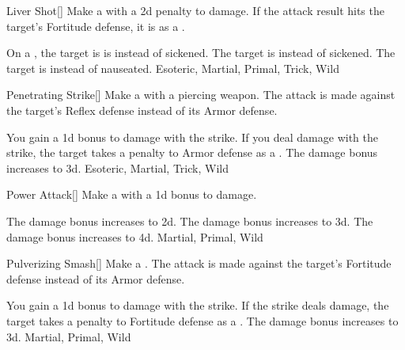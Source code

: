 \lowercase{\hypertarget{maneuver:Liver Shot}{}}\label{maneuver:Liver Shot}
\hypertarget{maneuver:Liver Shot}{}
\begin{freeability}{Liver Shot}[]
Make a  with a \minus2d penalty to damage.
If the attack result hits the target's Fortitude defense,
it is  as a .

\rankline
{} On a , the target is is  instead of sickened.
 The target is  instead of sickened.
 The target is  instead of nauseated.
 Esoteric, Martial, Primal, Trick, Wild
\end{freeability}
\vspace{0.25em}



\lowercase{\hypertarget{maneuver:Penetrating Strike}{}}\label{maneuver:Penetrating Strike}
\hypertarget{maneuver:Penetrating Strike}{}
\begin{freeability}{Penetrating Strike}[]
Make a  with a piercing weapon.
The attack is made against the target's Reflex defense instead of its Armor defense.

\rankline
{} You gain a \plus1d bonus to damage with the strike.
 If you deal damage with the strike, the target takes a  penalty to Armor defense as a .
 The damage bonus increases to \plus3d.
 Esoteric, Martial, Trick, Wild
\end{freeability}
\vspace{0.25em}



\lowercase{\hypertarget{maneuver:Power Attack}{}}\label{maneuver:Power Attack}
\hypertarget{maneuver:Power Attack}{}
\begin{freeability}{Power Attack}[]
Make a  with a \plus1d bonus to damage.

\rankline
{} The damage bonus increases to \plus2d.
 The damage bonus increases to \plus3d.
 The damage bonus increases to \plus4d.
 Martial, Primal, Wild
\end{freeability}
\vspace{0.25em}



\lowercase{\hypertarget{maneuver:Pulverizing Smash}{}}\label{maneuver:Pulverizing Smash}
\hypertarget{maneuver:Pulverizing Smash}{}
\begin{freeability}{Pulverizing Smash}[]
Make a .
The attack is made against the target's Fortitude defense instead of its Armor defense.

\rankline
{} You gain a \plus1d bonus to damage with the strike.
 If the strike deals damage, the target takes a  penalty to Fortitude defense as a .
 The damage bonus increases to \plus3d.
 Martial, Primal, Wild
\end{freeability}
\vspace{0.25em}



